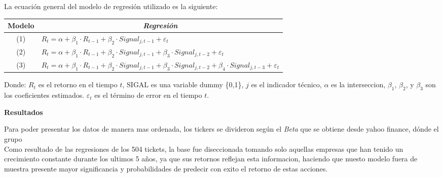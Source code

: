 \documentclass[a0,portrait]{a0poster}
\newcommand{\customsection}[1]{
    \begin{center}
        \begin{tcolorbox}[colframe=miRojo!50, colback=miRojo, width=\linewidth, boxrule=1mm, arc=3mm, auto outer arc]
            \centering
            \vspace{.5cm} %
            \color{white}
            \textbf{\Huge #1}
            \color{miRojo}
            \vspace{.5cm} %
        \end{tcolorbox}
    \end{center}
}
\begin{document}
\begin{multicols}{2}
    La ecuación general del modelo de regresión utilizado es la siguiente:

\begin{minipage}{.984\linewidth}
    \centering
    \vspace{1cm}
    \begin{tabular}{cl}
        \toprule

        \textbf{Modelo} & \multicolumn{1}{c}{\textbf{\textit{Regresión}}}   \\
        \midrule
        (1) & $R_t = \alpha +\beta_1 \cdot R_{t-1} + \beta_2 \cdot Signal_{j,t-1} + \varepsilon_t$ \\
        (2) & $R_t = \alpha +\beta_1 \cdot R_{t-1} + \beta_2 \cdot Signal_{j,t-1} + \beta_3 \cdot Signal_{j,t-2}+ \varepsilon_t$ \\
        (3) & $R_t = \alpha +\beta_1 \cdot R_{t-1} + \beta_2 \cdot Signal_{j,t-1} + \beta_3 \cdot Signal_{j,t-2}+\beta_4 \cdot Signal_{j,t-3}+\varepsilon_t$ \\
        \bottomrule
    \end{tabular}
    \captionsetup{width=0.8\textwidth}  %
    \caption*{\footnotesize Donde: $R_t$ es el retorno en el tiempo $t$, $\text{SIGAL}$ es una variable dummy \{0,1\}, $j$ es 
    el indicador técnico,     $\alpha$ es la interseccion, $\beta_1$, $\beta_2$, y $\beta_3$ son los coeficientes estimados.
    $\varepsilon_t$ es el término de error en el tiempo $t$.    }  %
    \vspace{.5cm}
    \end{minipage}
       
                
                
\columnbreak
    \customsection{Resultados}
    \par 
     \normalsize
     Para poder presentar los datos de manera mas ordenada, los tickers se divideron según el \textit{Beta} que se obtiene
      desde yahoo finance, dónde el grupo\\
    Como resultado de las regresiones de los 504 tickets, la base fue diseccionada tomando solo aquellas empresas 
    que han tenido un crecimiento constante durante los ultimos 5 años, ya que sus retornos reflejan esta informacion, 
    haciendo que nuesto modelo fuera de muestra presente mayor significancia y probabilidades de predecir con exito el 
    retorno de estas acciones.
    

    \vspace{1cm}

\end{multicols}
\end{document}
